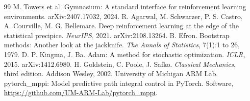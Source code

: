 \documentclass[11pt,a4paper]{article}
\begin{document}
\begin{thebibliography}{99}
 M. Towers et al. Gymnasium: A standard interface for reinforcement learning environments. arXiv:2407.17032, 2024.
 R. Agarwal, M. Schwarzer, P. S. Castro, A. Courville, M. G. Bellemare. Deep reinforcement learning at the edge of the statistical precipice. \emph{NeurIPS}, 2021. arXiv:2108.13264.
 B. Efron. Bootstrap methods: Another look at the jackknife. \emph{The Annals of Statistics}, 7(1):1 to 26, 1979.
 D. P. Kingma, J. Ba. Adam: A method for stochastic optimization. \emph{ICLR}, 2015. arXiv:1412.6980.
 H. Goldstein, C. Poole, J. Safko. \emph{Classical Mechanics}, third edition. Addison Wesley, 2002.
 University of Michigan ARM Lab. pytorch\_mppi: Model predictive path integral control in PyTorch. Software, \url{https://github.com/UM-ARM-Lab/pytorch_mppi}.
\end{thebibliography}
\end{document}
